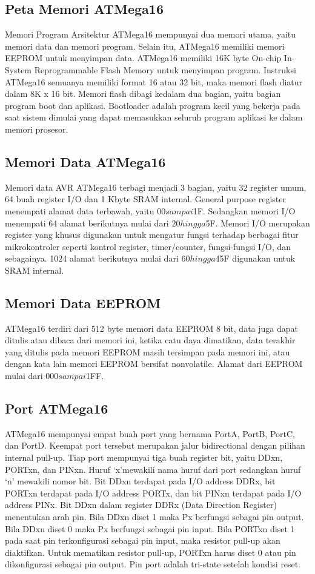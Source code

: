 	\subsection{Peta Memori ATMega16}
		Memori Program    Arsitektur ATMega16 mempunyai dua memori utama, yaitu memori data dan memori program.  Selain itu, ATMega16 memiliki memori EEPROM untuk menyimpan data.  ATMega16 memiliki 16K byte On-chip In-System Reprogrammable Flash Memory untuk menyimpan program.  Instruksi ATMega16 semuanya memiliki format 16 atau 32 bit, maka memori flash diatur dalam 8K x 16 bit.  Memori flash dibagi kedalam dua bagian, yaitu bagian program boot dan aplikasi. Bootloader adalah program kecil yang bekerja pada saat sistem dimulai yang dapat memasukkan seluruh program aplikasi ke dalam memori prosesor.
	\subsection{Memori Data ATMega16}
		Memori data AVR ATMega16 terbagi menjadi 3 bagian, yaitu 32 register umum, 64 buah register I/O dan 1 Kbyte SRAM internal.  General purpose register menempati alamat data terbawah, yaitu $00 sampai $1F.  Sedangkan memori I/O menempati 64 alamat berikutnya mulai dari $20 hingga $5F.  Memori I/O merupakan register yang khusus digunakan untuk mengatur fungsi terhadap berbagai fitur mikrokontroler seperti kontrol register, timer/counter, fungsi-fungsi I/O, dan sebagainya.  1024 alamat berikutnya mulai dari $60 hingga $45F digunakan untuk SRAM internal.
	\subsection{Memori Data EEPROM}
		ATMega16 terdiri dari 512 byte memori data EEPROM 8 bit, data juga dapat ditulis atau dibaca dari memori ini, ketika catu daya dimatikan, data terakhir yang ditulis pada memori EEPROM masih tersimpan pada memori ini, atau dengan kata lain memori EEPROM bersifat nonvolatile.  Alamat dari EEPROM mulai dari $000 sampai $1FF.
	\subsection{Port ATMega16}
		ATMega16 mempunyai empat buah port yang bernama  PortA, PortB, PortC, dan PortD. Keempat port tersebut merupakan jalur  bidirectional dengan pilihan  internal pull-up. Tiap port mempunyai tiga buah register bit, yaitu DDxn, PORTxn, dan PINxn. Huruf ‘x’mewakili nama huruf dari port sedangkan huruf ‘n’ mewakili nomor bit. Bit DDxn terdapat pada I/O address DDRx, bit PORTxn terdapat pada I/O address PORTx, dan bit PINxn terdapat pada I/O address PINx. Bit DDxn dalam register DDRx (Data Direction Register) menentukan arah pin. Bila DDxn diset 1 maka  Px berfungsi sebagai pin output. Bila DDxn diset 0 maka Px berfungsi sebagai pin input. Bila PORTxn diset 1 pada saat pin terkonfigurasi sebagai pin input, maka resistor pull-up akan diaktifkan. Untuk mematikan resistor  pull-up, PORTxn harus diset 0 atau pin dikonfigurasi sebagai pin output. Pin port adalah  tri-state setelah kondisi reset.

